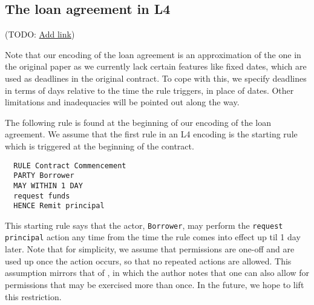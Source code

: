 \documentclass{article}
\begin{document}



\subsection{The loan agreement in L4}
(TODO:
\href{
  https://docs.google.com/spreadsheets/d/1_k17mzk2hTyPY2egbEVqXzr8uYAdi6BVqeMYdBxKB_I/edit#gid=864296175
}{Add link})

Note that our encoding of the loan agreement is an approximation of the
one in the original paper \cite{contract_as_automaton} as we currently lack
certain features like fixed dates, which are used as deadlines in the original
contract.
To cope with this, we specify deadlines in terms of days relative to the
time the rule triggers, in place of dates.
Other limitations and inadequacies will be pointed out along the way.

The following rule is found at the beginning of our encoding of the loan
agreement.
We assume that the first rule in an L4 encoding is the starting rule which is
triggered at the beginning of the contract.

\begin{lstlisting}
  RULE Contract Commencement
  PARTY Borrower
  MAY WITHIN 1 DAY
  request funds
  HENCE Remit principal
\end{lstlisting}

This starting rule says that the actor, \texttt{Borrower},
may perform the \texttt{request principal} action any time from the time the
rule comes into effect up til 1 day later.
Note that for simplicity, we assume that permissions are one-off and are
used up once the action occurs, so that no repeated actions are allowed.
This assumption mirrors that of \cite{real_time_contract_automata}, in which
the author notes that one can also allow for permissions that may be exercised
more than once.
In the future, we hope to lift this restriction.
\end{document}
